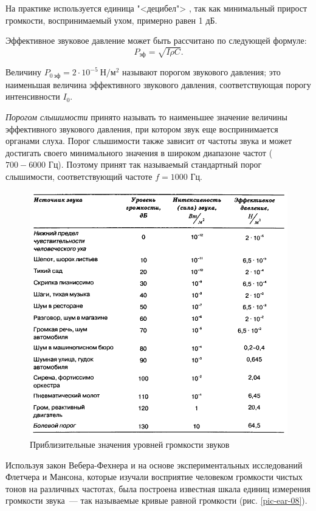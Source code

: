 \documentclass[oneside, final, 14pt]{extreport}
\begin{document}
На практике используется единица "<децибел"> , так как минимальный прирост громкости, воспринимаемый ухом, примерно равен 1 дБ.

Эффективное звуковое давление может быть рассчитано по следующей формуле:
\[P_{\text{эф}}=\sqrt{I \rho C}.\]

Величину \(P_{0~\text{эф}}=2\cdot10^{-5}\ \text{Н}/\text{м}^2\) называют порогом звукового давления; это наименьшая величина эффективного звукового давления, соответствующая порогу интенсивности $I_0$.

{\itshape Порогом слышимости} принято называть то наименьшее значение величины эффективного звукового давления, при котором звук еще воспринимается органами слуха. Порог слышимости также зависит от частоты звука и может достигать своего минимального значения в широком диапазоне частот ($700-6000$ Гц). Поэтому принят так называемый стандартный порог слышимости, соответствующий частоте $f=1000$ Гц.

\begin{figure}[h]
\centering
\includegraphics[scale=0.8]{pic-ear-07}
\caption{Приблизительные значения уровней громкости звуков}
\label{pic-ear-07}
\end{figure}

Используя закон Вебера-Фехнера и на основе экспериментальных исследований Флетчера и Мансона, которые изучали восприятие человеком громкости чистых тонов на различных частотах, была построена известная шкала единиц измерения громкости звука~--- так называемые кривые равной громкости (рис. \ref{pic-ear-08}).
\end{document}
